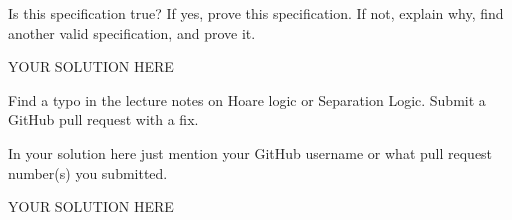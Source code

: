 \documentclass[11pt,twoside]{exam}
\begin{document}
\begin{questions}
\begin{parts}
Is this specification true? If yes, prove this specification. If not, explain why, find another valid specification, and prove it.

\begin{solution}
  YOUR SOLUTION HERE
\end{solution}

\end{parts}

\question

Find a typo in the lecture notes on Hoare logic or Separation Logic. Submit a
GitHub pull request with a fix.

In your solution here just mention your GitHub username or what pull request
number(s) you submitted.

\begin{solution}
  YOUR SOLUTION HERE
\end{solution}


\end{questions}
\end{document}
